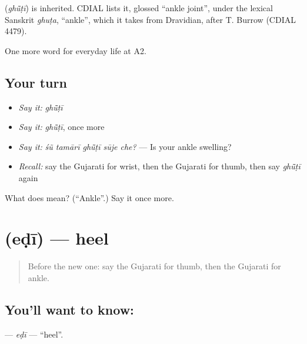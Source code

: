 \begin{cousinweb}
\textbf{} (\emph{ghū̃ṭī}) is inherited. CDIAL lists it, glossed \textquotedblleft{}ankle joint\textquotedblright{}, under the lexical Sanskrit \emph{ghuṭa}, \textquotedblleft{}ankle\textquotedblright{}, which it takes from Dravidian, after T. Burrow (CDIAL 4479).
\end{cousinweb}

\begin{grammarlens}[title={What you've built}]
One more word for everyday life at A2.
\end{grammarlens}

\subsection*{Your turn}
\begin{itemize}
\raggedright
  \item \emph{Say it:} \emph{ghū̃ṭī}
  \item \emph{Say it:} \emph{ghū̃ṭī}, once more
  \item \emph{Say it:} \emph{śũ tamārī ghū̃ṭī sūje che?} — Is your ankle swelling?
  \item \emph{Recall:} say the Gujarati for wrist, then the Gujarati for thumb, then say \emph{ghū̃ṭī} again
\end{itemize}

\begin{tcolorbox}[breakable,colback=teal!4,colframe=teal!35!black,title={Before you move on}]
What does  mean? (\textquotedblleft{}Ankle\textquotedblright{}.) Say it once more.
\end{tcolorbox}
\section[\texorpdfstring{\gu{એડી} (eḍī)}{એડી (eḍī)}]{ (eḍī) — heel}

\label{lesson:GU-C229-edi}



\begin{quote}
Before the new one: say the Gujarati for thumb, then the Gujarati for ankle.
\end{quote}

\subsection*{You'll want to know: }
\textbf{} — \emph{eḍī} — \textquotedblleft{}heel\textquotedblright{}.

